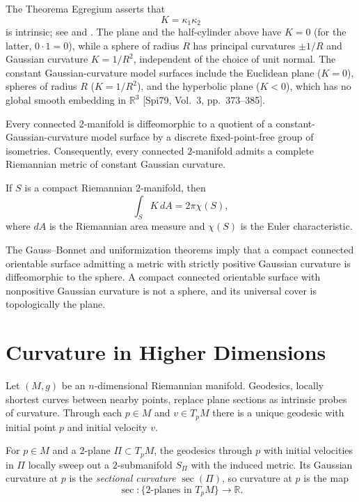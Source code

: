 The Theorema Egregium asserts that
\[
K=\kappa_1\kappa_2
\]
is intrinsic; see \cite{Gau65} and \cite[Vol.~2]{Spi79}. The plane and the half-cylinder above have
$K=0$ (for the latter, $0\cdot1=0$), while a sphere of radius $R$ has principal curvatures
$\pm1/R$ and Gaussian curvature $K=1/R^2$, independent of the choice of unit normal. The constant
Gaussian-curvature model surfaces include the Euclidean plane ($K=0$), spheres of radius $R$
($K=1/R^2$), and the hyperbolic plane ($K<0$), which has no global smooth embedding in $\mathbb R^3$
[Spi79, Vol.~3, pp.~373--385].

\begin{theorem}
\label{thm:uniformization-theorem}
\notready
Every connected $2$-manifold is diffeomorphic to a quotient of a constant-Gaussian-curvature model
surface by a discrete fixed-point-free group of isometries. Consequently, every connected
$2$-manifold admits a complete Riemannian metric of constant Gaussian curvature.
\end{theorem}

\begin{theorem}
\label{thm:gauss-bonnet-theorem-preview}
\notready
If $S$ is a compact Riemannian $2$-manifold, then
\[
\int_S K\,dA=2\pi\chi(S),
\]
where $dA$ is the Riemannian area measure and $\chi(S)$ is the Euler characteristic.
\end{theorem}

The Gauss--Bonnet and uniformization theorems imply that a compact connected orientable surface
admitting a metric with strictly positive Gaussian curvature is diffeomorphic to the sphere. A compact
connected orientable surface with nonpositive Gaussian curvature is not a sphere, and its universal
cover is topologically the plane.

\section{Curvature in Higher Dimensions}

Let $(M,g)$ be an $n$-dimensional Riemannian manifold. Geodesics, locally shortest curves between
nearby points, replace plane sections as intrinsic probes of curvature. Through each $p\in M$ and
$v\in T_pM$ there is a unique geodesic with initial point $p$ and initial velocity $v$.

For $p\in M$ and a $2$-plane $\Pi\subset T_pM$, the geodesics through $p$ with initial velocities
in $\Pi$ locally sweep out a $2$-submanifold $S_\Pi$ with the induced metric. Its Gaussian curvature
at $p$ is the \emph{sectional curvature} $\sec(\Pi)$, so curvature at $p$ is the map
\[
\sec\colon\{\text{2-planes in }T_pM\}\to\mathbb R.
\]


